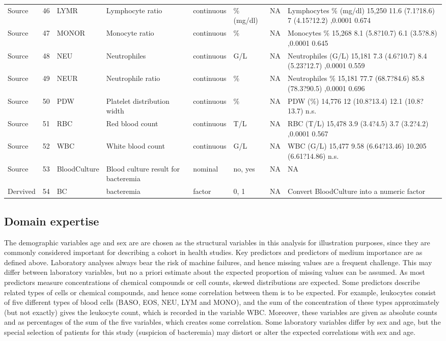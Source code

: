 \documentclass[
  letterpaper,
  DIV=11,
  numbers=noendperiod]{scrreport}
\begin{document}
\begin{longtable}{lrllllll}
Source & 46 & LYMR & Lymphocyte ratio & continuous & \% (mg/dl) & NA & Lymphocytes \% (mg/dl) 15,250 11.6 (7.1?18.6) 7 (4.15?12.2) ,0.0001 0.674 \\ 
Source & 47 & MONOR & Monocyte ratio & continuous & \% & NA & Monocytes \% 15,268 8.1 (5.8?10.7) 6.1 (3.5?8.8) ,0.0001 0.645 \\ 
Source & 48 & NEU & Neutrophiles & continuous & G/L & NA & Neutrophiles (G/L) 15,181 7.3 (4.6?10.7) 8.4 (5.23?12.7) ,0.0001 0.559 \\ 
Source & 49 & NEUR & Neutrophile ratio & continuous & \% & NA & Neutrophiles \% 15,181 77.7 (68.7?84.6) 85.8 (78.3?90.5) ,0.0001 0.696 \\ 
Source & 50 & PDW & Platelet distribution width & continuous & \% & NA & PDW (\%) 14,776 12 (10.8?13.4) 12.1 (10.8?13.7) n.s. \\ 
Source & 51 & RBC & Red blood count & continuous & T/L & NA & RBC (T/L) 15,478 3.9 (3.4?4.5) 3.7 (3.2?4.2) ,0.0001 0.567 \\ 
Source & 52 & WBC & White blood count & continuous & G/L & NA & WBC (G/L) 15,477 9.58 (6.64?13.46) 10.205 (6.61?14.86) n.s. \\ 
Source & 53 & BloodCulture & Blood culture result for bacteremia & nominal & no, yes & NA & NA \\ 
Dervived & 54 & BC & bacteremia & factor & 0, 1 & NA & Convert BloodCulture into a numeric factor \\ 
\bottomrule
\end{longtable}

\hypertarget{domain-expertise}{%
\subsection{Domain expertise}\label{domain-expertise}}

The demographic variables age and sex are are chosen as the structural
variables in this analysis for illustration purposes, since they are
commonly considered important for describing a cohort in health studies.
Key predictors and predictors of medium importance are as defined above.
Laboratory analyses always bear the risk of machine failures, and hence
missing values are a frequent challenge. This may differ between
laboratory variables, but no a priori estimate about the expected
proportion of missing values can be assumed. As most predictors measure
concentrations of chemical compounds or cell counts, skewed
distributions are expected. Some predictors describe related types of
cells or chemical compounds, and hence some correlation between them is
to be expected. For example, leukocytes consist of five different types
of blood cells (BASO, EOS, NEU, LYM and MONO), and the sum of the
concentration of these types approximately (but not exactly) gives the
leukocyte count, which is recorded in the variable WBC. Moreover, these
variables are given as absolute counts and as percentages of the sum of
the five variables, which creates some correlation. Some laboratory
variables differ by sex and age, but the special selection of patients
for this study (suspicion of bacteremia) may distort or alter the
expected correlations with sex and age.
\end{document}
